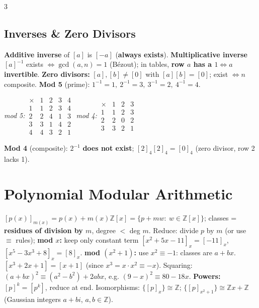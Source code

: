 \documentclass[9pt]{extarticle}
\newcommand{\hl}[1]{\textbf{\textcolor{BrickRed}{#1}}}
\begin{document}
\begin{multicols}{3}
\subsection{Inverses \& Zero Divisors}
\hl{Additive inverse} of $[a]$ is $[-a]$ (\hl{always exists}). \hl{Multiplicative inverse} $[a]^{-1}$ exists \hl{$\iff\gcd(a,n)=1$} (B\'ezout); in tables, \hl{row $a$ has a $1\iff a$ invertible}. \hl{Zero divisors:} $[a],[b]\ne[0]$ with $[a][b]=[0]$; exist $\iff n$ composite.
\textbf{Mod 5} (prime): $1^{-1}=1,\ 2^{-1}=3,\ 3^{-1}=2,\ 4^{-1}=4$.
\begin{center}\scriptsize
\textit{mod 5:}\,$\begin{array}{c|cccc}\times&1&2&3&4\\\hline1&1&2&3&4\\2&2&4&1&3\\3&3&1&4&2\\4&4&3&2&1\end{array}$\quad
\textit{mod 4:}\,$\begin{array}{c|ccc}\times&1&2&3\\\hline1&1&2&3\\2&2&0&2\\3&3&2&1\end{array}$
\end{center}
\textbf{Mod 4} (composite): $2^{-1}$ \hl{does not exist}; $[2]_4[2]_4=[0]_4$ (zero divisor, row 2 lacks 1).

\section{Polynomial Modular Arithmetic}
$[p(x)]_{m(x)}=p(x)+m(x)\mathbb Z[x]=\{p+mw:\ w\in\mathbb Z[x]\}$; classes = \hl{residues of division by $m$}, degree $<$ deg $m$.
Reduce: divide $p$ by $m$ (or use $\equiv$ rules); \hl{mod $x$:} keep only constant term $[x^2+5x-11]_x=[-11]_x$, $[x^5-3x^3+8]_x=[8]_x$. \hl{mod $(x^2+1)$:} use $x^2\equiv-1$: classes are $a+bx$. $[x^3+2x+1]=[x+1]$ (since $x^3=x\cdot x^2\equiv-x$). Squaring: $(a+bx)^2\equiv(a^2-b^2)+2abx$, e.g. $(9-x)^2\equiv80-18x$. \hl{Powers:} $[p]^k=[p^k]$, reduce at end. Isomorphisms: $\{[p]_x\}\cong\mathbb Z$; $\{[p]_{x^2+1}\}\cong\mathbb Z x+\mathbb Z$ (Gaussian integers $a+bi$, $a,b\in\mathbb Z$).


\end{multicols}
\end{document}
